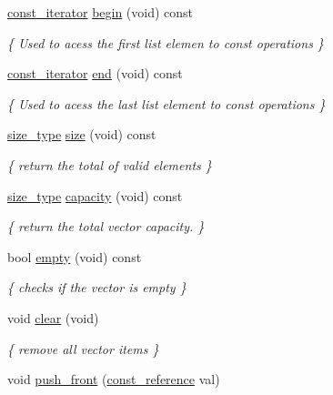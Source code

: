 \begin{DoxyCompactItemize}
\hyperlink{classMyIterator}{const\+\_\+iterator} \hyperlink{classvector_a117f81304b9a47b95414c658ed25070f}{begin} (void) const
\begin{DoxyCompactList}\small\item\em \{ Used to acess the first list elemen to const operations \} \end{DoxyCompactList}\item 
\hyperlink{classMyIterator}{const\+\_\+iterator} \hyperlink{classvector_abac232da26cdc5da35fdf597fc3f3b26}{end} (void) const
\begin{DoxyCompactList}\small\item\em \{ Used to acess the last list element to const operations \} \end{DoxyCompactList}\item 
\hyperlink{classvector_a4d06f3ade0c2ac023b7a7edb85d9d1ef}{size\+\_\+type} \hyperlink{classvector_aff204421c89d6ba008c01bd2db9a5844}{size} (void) const
\begin{DoxyCompactList}\small\item\em \{ return the total of valid elements \} \end{DoxyCompactList}\item 
\hyperlink{classvector_a4d06f3ade0c2ac023b7a7edb85d9d1ef}{size\+\_\+type} \hyperlink{classvector_a07f59d5072ec6ce9a895bb25e730871d}{capacity} (void) const
\begin{DoxyCompactList}\small\item\em \{ return the total vector capacity. \} \end{DoxyCompactList}\item 
bool \hyperlink{classvector_a0ee0e78b263a685dcddef3d193725bd8}{empty} (void) const
\begin{DoxyCompactList}\small\item\em \{ checks if the vector is empty \} \end{DoxyCompactList}\item 
\mbox{\label{classvector_a4e30cac5c85ada223fafc5ef530475c5}} 
void \hyperlink{classvector_a4e30cac5c85ada223fafc5ef530475c5}{clear} (void)
\begin{DoxyCompactList}\small\item\em \{ remove all vector items \} \end{DoxyCompactList}\item 
void \hyperlink{classvector_a1dab5eb5f1247cadc4caf77386b61010}{push\+\_\+front} (\hyperlink{classvector_aad263433b4072dfbc26ace0df6441960}{const\+\_\+reference} val)

\end{DoxyCompactItemize}
